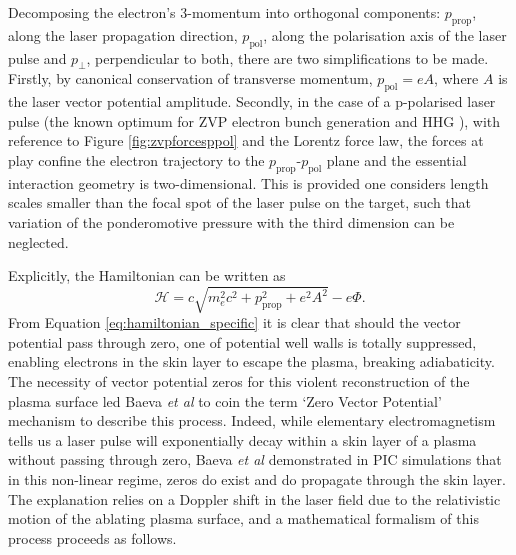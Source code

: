 Decomposing the electron's 3-momentum into orthogonal components: $p_\mathrm{prop}$, along the laser propagation direction, $p_\mathrm{pol}$, along the polarisation axis of the laser pulse and $p_\perp$, perpendicular to both, there are two simplifications to be made. Firstly, by canonical conservation of transverse momentum, $p_\mathrm{pol} = eA$, where $A$ is the laser vector potential amplitude. Secondly, in the case of a p-polarised laser pulse (the known optimum for ZVP electron bunch generation \cite{savinAttosecondscaleAbsorptionExtreme2017} and \ac{HHG} \cite{baevaTheoryHighorderHarmonic2006}), with reference to Figure \ref{fig:zvpforcesppol} and the Lorentz force law, the forces at play confine the electron trajectory to the $p_\mathrm{prop}$-$p_\mathrm{pol}$ plane and the essential interaction geometry is two-dimensional. This is provided one considers length scales smaller than the focal spot of the laser pulse on the target, such that variation of the ponderomotive pressure with the third dimension can be neglected.

Explicitly, the Hamiltonian can be written as
\begin{equation}\label{eq:hamiltonian_specific}
	\mathcal{H} = c\sqrt{m^2_ec^2 + p^2_\mathrm{prop} + e^2A^2} - e\Phi.
\end{equation}
From Equation \ref{eq:hamiltonian_specific} it is clear that should the vector potential pass through zero, one of potential well walls is totally suppressed, enabling electrons in the skin layer to escape the plasma, breaking adiabaticity. The necessity of vector potential zeros for this violent reconstruction of the plasma surface led Baeva \textit{et al} \cite{baevaZeroVectorPotential2011} to coin the term `Zero Vector Potential' mechanism to describe this process. Indeed, while elementary electromagnetism tells us a laser pulse will exponentially decay within a skin layer of a plasma without passing through zero, Baeva \textit{et al} \cite{baevaZeroVectorPotential2011} demonstrated in \ac{PIC} simulations that in this non-linear regime, zeros do exist and do propagate through the skin layer. The explanation relies on a Doppler shift in the laser field due to the relativistic motion of the ablating plasma surface, and a mathematical formalism of this process proceeds as follows.


